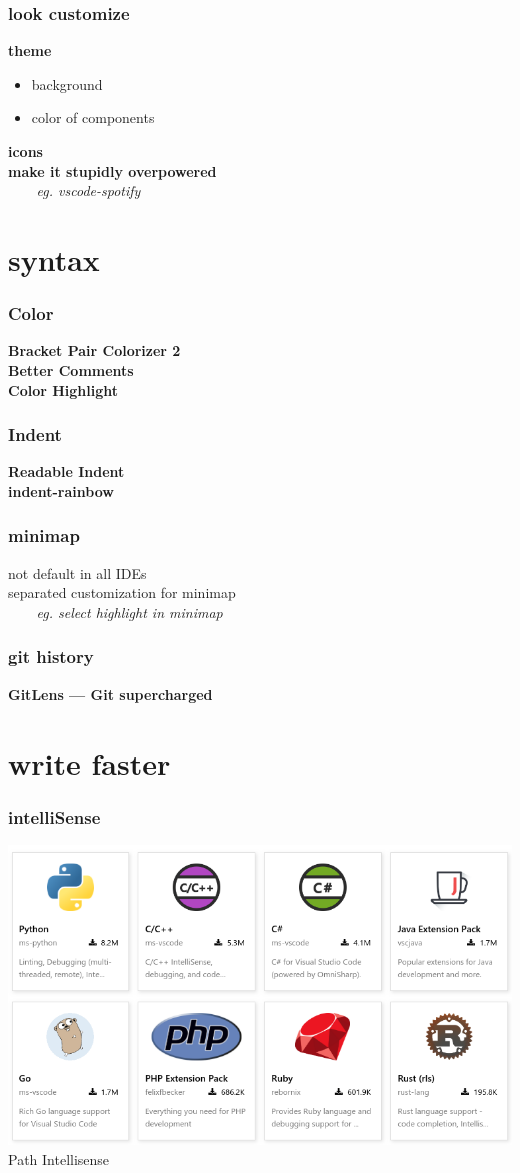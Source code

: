 \documentclass{beamer}
\begin{document}
\begin{frame}
\frametitle{look customize}
\textbf{theme}
\begin{itemize}
\item background
\item color of components
\end{itemize}
\textbf{icons}\\
\textbf{make it stupidly overpowered}\\
\textit{~~~~eg. vscode-spotify}
\end{frame}


\section{syntax}
\begin{frame}
\frametitle{Color}
\textbf{Bracket Pair Colorizer 2}\\
\textbf{Better Comments}\\
\textbf{Color Highlight}

\end{frame}

\begin{frame}
\frametitle{Indent}
\textbf{Readable Indent}\\
\textbf{indent-rainbow}

\end{frame}

\begin{frame}
\frametitle{minimap}
not default in all IDEs\\
separated customization for minimap\\
\textit{~~~~eg. select highlight in minimap}
\end{frame}

\begin{frame}
\frametitle{git history}
\textbf{GitLens — Git supercharged}
\end{frame}


\section{write faster}
\begin{frame}
\frametitle{intelliSense}
\includegraphics[scale=0.4]{images/intelisense.png}
Path Intellisense
\end{frame}
\end{document}
